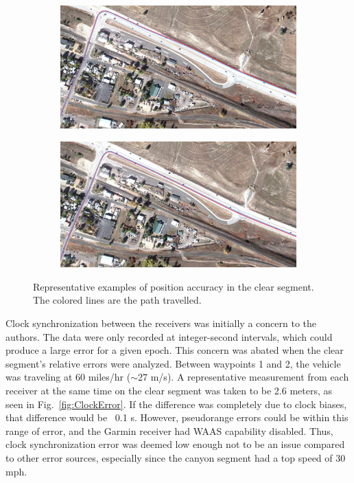 \documentclass[]{aiaa-tc}%
\begin{document}
	\begin{figure}[H]
		\centering
		\begin{subfigure}
			\centering
			\includegraphics[width = 13cm]{inboutClearSeg.PNG}
		\end{subfigure}
		\begin{subfigure}
			\centering
			\includegraphics[width = 13cm]{outboutClearSeg.PNG}
		\end{subfigure}
		\caption{Representative examples of position accuracy in the clear segment. The colored lines are the path travelled.}
		\label{fig:inboutClearSeg}
	\end{figure}
	
	\noindent Clock synchronization between the receivers was initially a concern to the authors. The data were only recorded at integer-second intervals, which could produce a large error for a given epoch. This concern was abated when the clear segment's relative errors were analyzed. Between waypoints 1 and 2, the vehicle was traveling at 60 miles/hr ($\sim$27 m/s). A representative measurement from each receiver at the same time on the clear segment was taken to be 2.6 meters, as seen in Fig.~\ref{fig:ClockError}. If the difference was completely due to clock biases, that difference would be ~0.1 s. However, pseudorange errors could be within this range of error, and the Garmin receiver had WAAS capability disabled. Thus, clock synchronization error was deemed low enough not to be an issue compared to other error sources, especially since the canyon segment had a top speed of 30 mph.
	
\end{document}
